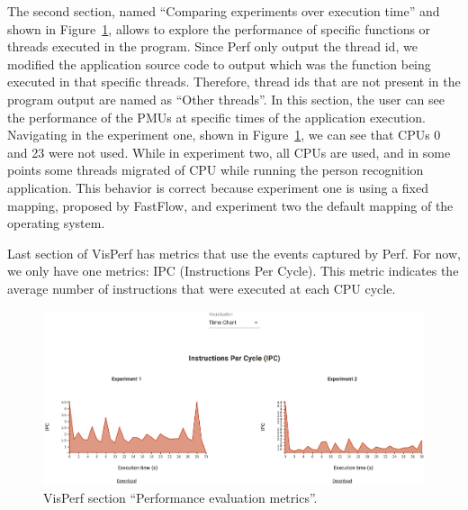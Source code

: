 The second section, named ``Comparing experiments over execution time'' and shown in Figure~\ref{figure:visperf-section-2}, allows to explore the performance of specific functions or threads executed in the program. Since Perf only output the thread id, we modified the application source code to output which was the function being executed in that specific threads. Therefore, thread ids that are not present in the program output are named as ``Other threads''. In this section, the user can see the performance of the PMUs at specific times of the application execution. Navigating in the experiment one, shown in Figure~\ref{figure:visperf-section-2}, we can see that CPUs 0 and 23 were not used. While in experiment two, all CPUs are used, and in some points some threads migrated of CPU while running the person recognition application. This behavior is correct because experiment one is using a fixed mapping, proposed by FastFlow, and experiment two the default mapping of the operating system.

Last section of VisPerf has metrics that use the events captured by Perf. For now, we only have one metrics: IPC (Instructions Per Cycle). This metric indicates the average number of instructions that were executed at each CPU cycle.

\begin{figure}
    \centering
    \includegraphics[width=1.0\columnwidth]{../pictures/visperf-section-3.png}
    \caption{VisPerf section ``Performance evaluation metrics''.}
    \label{figure:visperf-section-2}
\end{figure}
